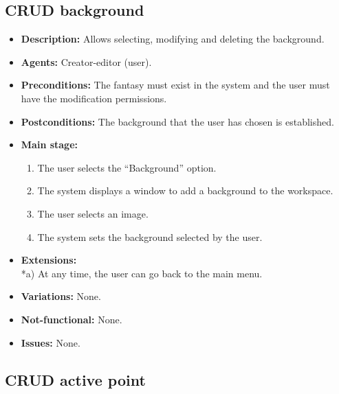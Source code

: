 \subsection{CRUD background}
\begin{itemize}
	\item \textbf{Description:} Allows selecting, modifying and deleting the background.
	\item \textbf{Agents:} Creator-editor (user).
	\item \textbf{Preconditions:} The fantasy must exist in the system and the user must have the modification permissions.
	\item \textbf{Postconditions:} The background that the user has chosen is established.
	\item \textbf{Main stage:}
	\begin{enumerate}
		\item The user selects the ``Background'' option.
		\item The system displays a window to add a background to the workspace.
		\item The user selects an image.
		\item The system sets the background selected by the user.
	\end{enumerate}
	\item \textbf{Extensions:} \\ *a) At any time, the user can go back to the main menu. 
	\item \textbf{Variations:} None.
	\item \textbf{Not-functional:} None.
	\item \textbf{Issues:} None.
\end{itemize}


\subsection{CRUD active point}
